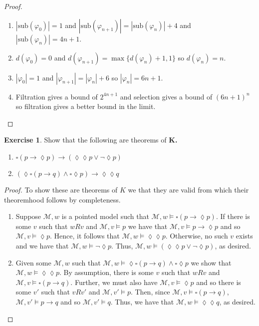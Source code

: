 \documentclass{article}
\newcommand{\vp}{\varphi}
\newcommand{\cM}{\mathcal{M}}
\newcommand{\sub}{\text{sub}}
\theoremstyle{definition}
\newtheorem{exercise}{Exercise}
\begin{document}
\begin{proof} \mbox{}
    \begin{enumerate}[label = (\alph*)]
        \item $|\sub(\vp_0)| = 1$ and $|\sub(\vp_{n+1})| = |\sub(\vp_n)|+4$ and $|\sub(\vp_n)| = 4n+1$. 
        \item $d(\vp_0)=0$ and $d(\vp_{n+1}) = \max\{d(\vp_n)+1, 1\}$ so $d(\vp_n)=n$. 
        \item $|\vp_0| = 1$ and $|\vp_{n+1}| = |\vp_n| + 6$ so $|\vp_n| = 6n+1$. 
        \item Filtration gives a bound of $2^{4n+1}$ and selection gives a bound of $(6n+1)^n$ so filtration gives a better bound in the limit. 
    \end{enumerate}
\end{proof}

\begin{exercise}
    Show that the following are theorems of \bf{K}. 
    \begin{enumerate}
        \item $\square(p \to \lozenge p) \to (\lozenge \lozenge p \vee \neg \lozenge p)$ 
        \item $(\lozenge \square(p \to q) \wedge \square \lozenge p) \to \lozenge \lozenge q$
    \end{enumerate}
\end{exercise}

\begin{proof} To show these are theorems of $K$ we that they are valid from which their theoremhood follows by completeness. 
    \begin{enumerate}[label = (\alph*)]
        \item Suppose $\cM, w$ is a pointed model such that $\cM, w \models \square(p \to \lozenge p)$. If there is some $v$ such that $wRv$ and $\cM, v \models p$ we have that $\cM, v \models p \to \lozenge p$ and so $\cM, v \models \lozenge p$. Hence, it follows that $\cM, w \models \lozenge \lozenge p$. Otherwise, no such $v$ exists and we have that $\cM, w \models \neg \lozenge p$. Thus, $\cM, w \models (\lozenge \lozenge p \vee \neg \lozenge p)$, as desired. 
        \item Given some $\cM, w$ such that $\cM,w \models \lozenge \square (p \to q) \wedge \square \lozenge p$ we show that $\cM, w \models \lozenge \lozenge p$. By assumption, there is some $v$ such that $w Rv$ and $\cM, v \models \square (p \to q)$. Further, we must also have $\cM, v \models \lozenge p$ and so there is some $v'$ such that $v R v'$ and $\cM, v' \models p$. Then, since $\cM, v \models \square(p \to q)$, $\cM, v' \models p \to q$ and so $\cM, v' \models q$. Thus, we have that $\cM, w \models \lozenge \lozenge q$, as desired. 
     \end{enumerate}
\end{proof}
\end{document}
